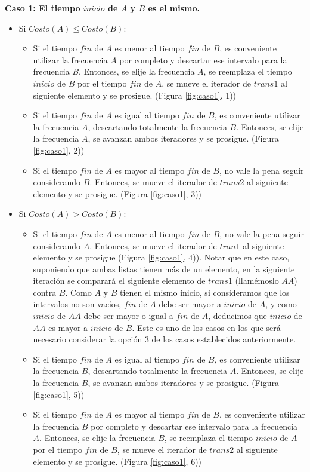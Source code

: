 {\bf Caso 1: El tiempo $inicio$ de $A$ y $B$ es el mismo.}

\begin{itemize}
\item Si $Costo(A) \leq Costo(B)$:
	\begin{itemize}
	\item Si el tiempo $fin$ de $A$ es menor al tiempo $fin$ de $B$, es conveniente utilizar la frecuencia $A$ por completo y descartar ese intervalo para la frecuencia $B$. Entonces, se elije la frecuencia $A$, se reemplaza el tiempo $inicio$ de $B$ por el tiempo $fin$ de $A$, se mueve el iterador de $trans1$ al siguiente elemento y se prosigue. (Figura \ref{fig:caso1}, 1))
	\item Si el tiempo $fin$ de $A$ es igual al tiempo $fin$ de $B$, es conveniente utilizar la frecuencia $A$, descartando totalmente la frecuencia $B$.  Entonces, se elije la frecuencia $A$, se avanzan ambos iteradores y se prosigue. (Figura \ref{fig:caso1}, 2))
	\item Si el tiempo $fin$ de $A$ es mayor al tiempo $fin$ de $B$, no vale la pena seguir considerando $B$. Entonces, se mueve el iterador de $trans2$ al siguiente elemento y se prosigue. (Figura \ref{fig:caso1}, 3))
	\end{itemize}
\item Si $Costo(A) > Costo(B)$:
	\begin{itemize}
	\item Si el tiempo $fin$ de $A$ es menor al tiempo $fin$ de $B$, no vale la pena seguir considerando $A$. Entonces, se mueve el iterador de $tran1$ al siguiente elemento y se prosigue (Figura \ref{fig:caso1}, 4)). Notar que en este caso, suponiendo que ambas listas tienen más de un elemento, en la siguiente iteración se comparará el siguiente elemento de $trans1$ (llamémoslo $AA$) contra $B$.  Como $A$ y $B$ tienen el mismo inicio, si consideramos que los intervalos no son vacíos, $fin$ de $A$ debe ser mayor a $inicio$ de $A$, y como $inicio$ de $AA$ debe ser mayor o igual a $fin$ de $A$, deducimos que $inicio$ de $AA$ es mayor a $inicio$ de $B$.  Este es uno de los casos en los que será necesario considerar la opción 3 de los casos establecidos anteriormente.
	\item Si el tiempo $fin$ de $A$ es igual al tiempo $fin$ de $B$, es conveniente utilizar la frecuencia $B$, descartando totalmente la frecuencia $A$.  Entonces, se elije la frecuencia $B$, se avanzan ambos iteradores y se prosigue. (Figura \ref{fig:caso1}, 5))
	\item Si el tiempo $fin$ de $A$ es mayor al tiempo $fin$ de $B$, es conveniente utilizar la frecuencia $B$ por completo y descartar ese intervalo para la frecuencia $A$. Entonces, se elije la frecuencia $B$, se reemplaza el tiempo $inicio$ de $A$ por el tiempo $fin$ de $B$, se mueve el iterador de $trans2$ al siguiente elemento y se prosigue. (Figura \ref{fig:caso1}, 6))
	\end{itemize}
\end{itemize}

